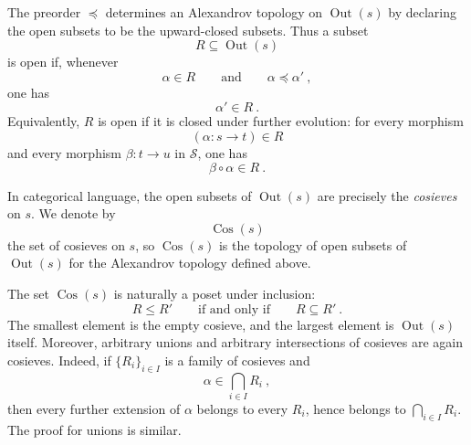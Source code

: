 \documentclass[a4paper,reqno,oneside]{amsart}
\theoremstyle{definition}
\theoremstyle{remark}
\numberwithin{equation}{section}
\begin{document}
	The preorder $\preceq$ determines an Alexandrov topology on
	$\operatorname{Out}(s)$ by declaring the open subsets to be the
	upward-closed subsets. Thus a subset
	\begin{equation}
		R\subseteq \operatorname{Out}(s)
	\end{equation}
	is open if, whenever
	\begin{equation}
		\alpha\in R
		\qquad
		\text{and}
		\qquad
		\alpha\preceq\alpha' \ ,
	\end{equation}
	one has
	\begin{equation}
		\alpha'\in R \ .
	\end{equation}
	Equivalently, $R$ is open if it is closed under further evolution: for every
	morphism
	\begin{equation}
		(\alpha\colon s\to t)\in R
	\end{equation}
	and every morphism $\beta\colon t\to u$ in $\mathcal S$, one has
	\begin{equation}
		\beta\circ\alpha\in R \ .
	\end{equation}
	
	In categorical language, the open subsets of $\operatorname{Out}(s)$ are precisely the \textit{cosieves} on $s$. We denote by
	\begin{equation}
		\operatorname{Cos}(s)
	\end{equation}
	the set of cosieves on $s$, so $\operatorname{Cos}(s)$ is the
	topology of open subsets of $\operatorname{Out}(s)$ for the Alexandrov
	topology defined above.
	
	The set $\operatorname{Cos}(s)$ is naturally a poset under inclusion:
	\begin{equation}
		R\leq R'
		\qquad
		\text{if and only if}
		\qquad
		R\subseteq R' \ .
	\end{equation}
	The smallest element is the empty cosieve, and the largest element is
	$\operatorname{Out}(s)$ itself. Moreover, arbitrary unions and arbitrary
	intersections of cosieves are again cosieves. Indeed, if
	$\{R_i\}_{i\in I}$ is a family of cosieves and
	\begin{equation}
		\alpha\in\bigcap_{i\in I}R_i \ ,
	\end{equation}
	then every further extension of $\alpha$ belongs to every $R_i$, hence
	belongs to $\bigcap_{i\in I}R_i$. The proof for unions is similar.
	
\end{document}
